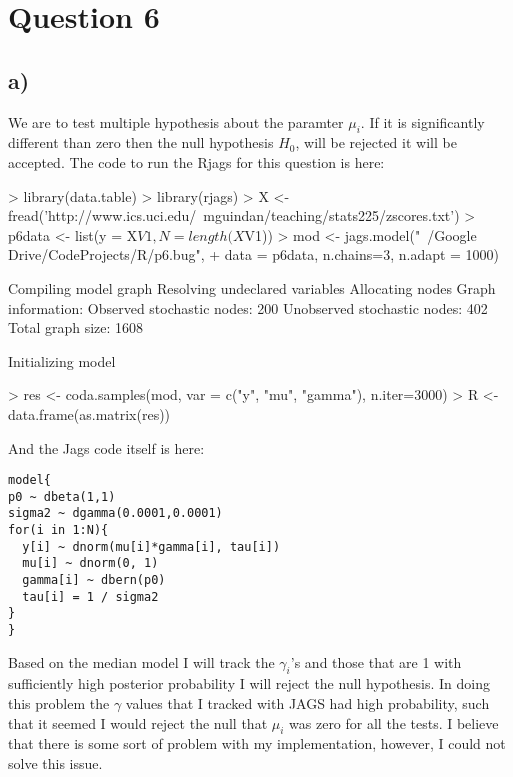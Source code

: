 \documentclass{article}
\begin{document}
\section*{Question 6}
\subsection*{a)}
We are to test multiple hypothesis about the paramter $ \mu_i $. If it is significantly different than zero then the null hypothesis $ H_0 $, will be rejected it will be accepted. The code to run the Rjags for this question is here:
\begin{Schunk}
\begin{Sinput}
> library(data.table)
> library(rjags)
> X <-fread('http://www.ics.uci.edu/~mguindan/teaching/stats225/zscores.txt')
> p6data <-  list(y = X$V1, N = length(X$V1))
> mod <- jags.model("~/Google Drive/CodeProjects/R/p6.bug",
+                   data = p6data, n.chains=3, n.adapt = 1000)
\end{Sinput}
\begin{Soutput}
Compiling model graph
   Resolving undeclared variables
   Allocating nodes
Graph information:
   Observed stochastic nodes: 200
   Unobserved stochastic nodes: 402
   Total graph size: 1608

Initializing model
\end{Soutput}
\begin{Sinput}
> res <- coda.samples(mod, var = c("y", "mu", "gamma"), n.iter=3000)
> R <- data.frame(as.matrix(res))
\end{Sinput}
\end{Schunk}
And the Jags code itself is here:
\begin{verbatim}
model{
p0 ~ dbeta(1,1)
sigma2 ~ dgamma(0.0001,0.0001)
for(i in 1:N){
  y[i] ~ dnorm(mu[i]*gamma[i], tau[i])
  mu[i] ~ dnorm(0, 1)
  gamma[i] ~ dbern(p0)
  tau[i] = 1 / sigma2
}
}
\end{verbatim}
Based on the median model I will track the $ \gamma_i$'s and those that are 1 with sufficiently high posterior probability I will reject the null hypothesis. In doing this problem the $\gamma$ values that I tracked with JAGS had high probability, such that it seemed I would reject the null that $\mu_i$ was zero for all the tests. I believe that there is some sort of problem with my implementation, however, I could not solve this issue. 
\end{document}
